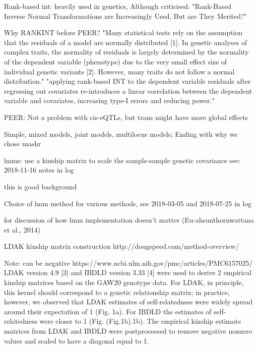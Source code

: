 Rank-based int:
heavily used in genetics, 
    Although criticised: "Rank-Based Inverse Normal Transformations are Increasingly Used, But are They Merited?"

Why RANKINT before PEER?
"Many statistical tests rely on the assumption that the residuals of a model are normally distributed [1]. In genetic analyses of complex traits, the normality of residuals is largely determined by the normality of the dependent variable (phenotype) due to the very small effect size of individual genetic variants [2]. However, many traits do not follow a normal distribution."
"applying rank-based INT to the dependent variable residuals after regressing out covariates re-introduces a linear correlation between the dependent variable and covariates, increasing type-I errors and reducing power."

PEER:
Not a problem with cis-eQTLs, but trans might have more global effects

Simple, mixed models, joint models, multilocus models; Ending with why we chose mashr

lmms: use a kinship matrix to scale the sample-sample genetic covariance
see: 2018-11-16 notes in log

this is good background

Choice of lmm method
for various methods, see 2018-03-05 and 2018-07-25 in log

for discussion of how lmm implementation doesn't matter (Eu-ahsunthornwattana et al., 2014)

LDAK kinship matrix construction http://dougspeed.com/method-overview/

Note: can be negative
https://www.ncbi.nlm.nih.gov/pmc/articles/PMC6157025/
LDAK version 4.9 [3] and IBDLD version 3.33 [4] were used to derive 2 empirical kinship matrices based on the GAW20 genotype data. For LDAK, in principle, this kernel should correspond to a genetic relationship matrix; in practice, however, we observed that LDAK estimates of self-relatedness were widely spread around their expectation of 1 (Fig. 1a). For IBDLD the estimates of self-relatedness were closer to 1 (Fig. (Fig.1b).1b). The empirical kinship estimate matrices from LDAK and IBDLD were postprocessed to remove negative nonzero values and scaled to have a diagonal equal to 1.

